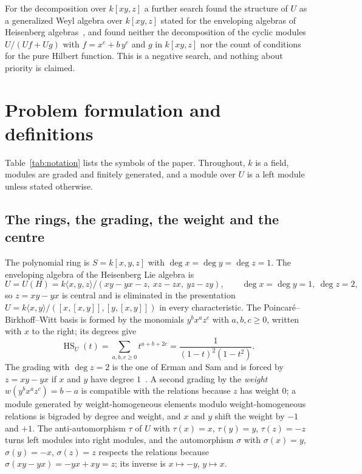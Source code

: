 \documentclass[11pt]{article}
\theoremstyle{definition}
\theoremstyle{remark}
\newcommand{\Hilb}{\operatorname{HS}}
\begin{document}
For the decomposition over $k[xy,z]$ a further search found the structure of $U$ as a generalized Weyl algebra over $k[xy,z]$ stated for the enveloping algebras of Heisenberg algebras~\cite{BenkartOndrus}, and found neither the decomposition of the cyclic modules $U/(Uf+Ug)$ with $f=x^e+b\,y^e$ and $g$ in $k[xy,z]$ nor the count of conditions for the pure Hilbert function. This is a negative search, and nothing about priority is claimed.

\FloatBarrier
\section{Problem formulation and definitions}
\label{sec:setting}

Table~\ref{tab:notation} lists the symbols of the paper. Throughout, $k$ is a field, modules are graded and finitely generated, and a module over $U$ is a left module unless stated otherwise.

\begin{table}[htbp]
\centering\footnotesize

\caption{Notation: each symbol, its meaning, and the section or statement where it is introduced; the five evidence marks are defined in Section~\ref{sec:results-list}.}
\label{tab:notation}
\end{table}

\subsection{The rings, the grading, the weight and the centre}
\label{sec:rings}

The polynomial ring is $S=k[x,y,z]$ with $\deg x=\deg y=\deg z=1$. The enveloping algebra of the Heisenberg Lie algebra is
\begin{equation}\label{eq:U}
U=U(H)=k\langle x,y,z\rangle/(xy-yx-z,\ xz-zx,\ yz-zy),\qquad \deg x=\deg y=1,\ \deg z=2,
\end{equation}
so $z=xy-yx$ is central and is eliminated in the presentation $U=k\langle x,y\rangle/([x,[x,y]],[y,[x,y]])$ in every characteristic. The Poincar\'e--Birkhoff--Witt basis is formed by the monomials $y^bx^az^c$ with $a,b,c\ge0$, written with $x$ to the right; its degrees give
\begin{equation}\label{eq:HSU}
\Hilb_U(t)=\sum_{a,b,c\ge0}t^{a+b+2c}=\frac1{(1-t)^2(1-t^2)}.
\end{equation}
The grading with $\deg z=2$ is the one of Erman and Sam and is forced by $z=xy-yx$ if $x$ and $y$ have degree $1$~\cite[Section~6]{ES16}. A second grading by the \emph{weight} $w(y^bx^az^c)=b-a$ is compatible with the relations because $z$ has weight $0$; a module generated by weight-homogeneous elements modulo weight-homogeneous relations is bigraded by degree and weight, and $x$ and $y$ shift the weight by $-1$ and $+1$. The anti-automorphism $\tau$ of $U$ with $\tau(x)=x$, $\tau(y)=y$, $\tau(z)=-z$ turns left modules into right modules, and the automorphism $\sigma$ with $\sigma(x)=y$, $\sigma(y)=-x$, $\sigma(z)=z$ respects the relations because $\sigma(xy-yx)=-yx+xy=z$; its inverse is $x\mapsto-y$, $y\mapsto x$.
\end{document}
